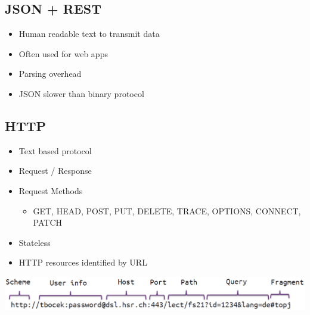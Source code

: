 \subsection{JSON + REST}
\begin{itemize}
    \item Human readable text to transmit data
    \item Often used for web apps
    \item Parsing overhead
    \item JSON slower than binary protocol
\end{itemize}

\subsection{HTTP}
\begin{itemize}
    \item Text based protocol
    \item Request / Response
    \item Request Methods
    \begin{itemize}
        \item GET, HEAD, POST, PUT, DELETE, TRACE, OPTIONS, CONNECT, PATCH
    \end{itemize}
    \item Stateless
    \item HTTP resources identified by URL
\end{itemize}
\includegraphics[width=\linewidth]{img/http.png}

